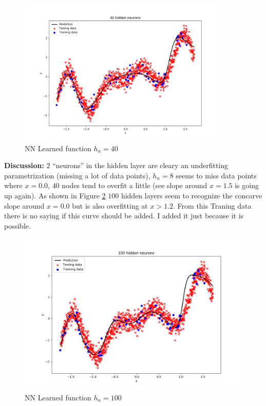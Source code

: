 \documentclass[12pt,a4paper]{article}
\begin{document}
\begin{enumerate}[a)]
\begin{figure}[H]
	\centering
  \includegraphics[width=0.9\textwidth]{figures/1_1_a_hn_40.png}
	\caption{NN Learned function $h_n=40$}
	\label{1_1_a_hn_40}
\end{figure}
  
\textbf{Discussion: } $2$ ``neurons'' in the hidden layer are cleary an
underfitting parametrization (missing a lot of data points), $h_n = 8$ seems to
miss data points where $ x = 0.0$, $40$ nodes tend to overfit a little (see
slope around $x = 1.5$ is going up again). As shown in Figure \ref{1_1_a_hn_100}
$100$ hidden layers seem to recognize the concarve slope around $x = 0.0$ but is
also overfitting at $x > 1.2$. From this Traning data there is no saying if this
curve should be added. I added it just because it is possible.

\begin{figure}[H]
	\centering
  \includegraphics[width=\textwidth]{figures/1_1_a_hn_100.png}
	\caption{NN Learned function $h_n=100$}
	\label{1_1_a_hn_100}
\end{figure}


\end{enumerate}
\end{document}
